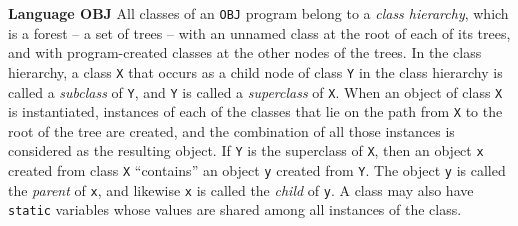 \begin{minipage}[t]{\sw}
\slidenumber
\LARGE
{\bf Language OBJ}\exx
All classes of an \verb'OBJ' program belong to a {\em class hierarchy},
which is a forest -- a set of trees -- with an unnamed class at the root
of each of its trees,
and with program-created classes at the other nodes of the trees.\exx
In the class hierarchy,
a class \verb'X' that occurs as a child node of class \verb'Y'
in the class hierarchy
is called a {\em subclass} of \verb'Y',
and \verb'Y' is called a {\em superclass} of \verb'X'.\exx
When an object of class \verb'X' is instantiated,
instances of each of the classes that lie
on the path from \verb'X' to the root of the tree
are created, and the combination of all those instances
is considered as the resulting object.\exx
If \verb'Y' is the superclass of \verb'X',
then an object \verb'x' created from class \verb'X' ``contains''
an object \verb'y' created from \verb'Y'.
The object \verb'y' is called the {\em parent} of \verb'x',
and likewise \verb'x' is called the {\em child} of \verb'y'.\exx
A class may also have \verb'static' variables
whose values are shared among all instances of the class.
\end{minipage}
